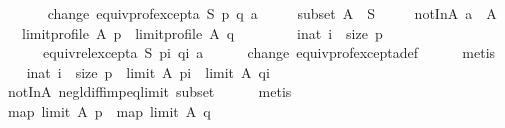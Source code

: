 \begin{isabellebody}
\ \ \isanewline
\ \ \ \ change{\isacharcolon}{\kern0pt}\ {\isachardoublequoteopen}equiv{\isacharunderscore}{\kern0pt}prof{\isacharunderscore}{\kern0pt}except{\isacharunderscore}{\kern0pt}a\ S\ p\ q\ a{\isachardoublequoteclose}\ \isanewline
\ \ \ \ subset{\isacharcolon}{\kern0pt}\ {\isachardoublequoteopen}A\ {\isasymsubseteq}\ S{\isachardoublequoteclose}\ \isanewline
\ \ \ \ notInA{\isacharcolon}{\kern0pt}\ {\isachardoublequoteopen}a\ {\isasymnotin}\ A{\isachardoublequoteclose}\isanewline
\ \ \ {\isachardoublequoteopen}limit{\isacharunderscore}{\kern0pt}profile\ A\ p\ {\isacharequal}{\kern0pt}\ limit{\isacharunderscore}{\kern0pt}profile\ A\ q{\isachardoublequoteclose}\isanewline
%
\isadelimproof
%
\endisadelimproof
%
\isatagproof
{}\isamarkupfalse%
\ {\isacharminus}{\kern0pt}\isanewline
\ \ \isamarkupfalse%
\isanewline
\ \ \ \ {\isachardoublequoteopen}{\isasymforall}i{\isacharcolon}{\kern0pt}{\isacharcolon}{\kern0pt}nat{\isachardot}{\kern0pt}\ i\ {\isacharless}{\kern0pt}\ size\ p\ {\isasymlongrightarrow}\isanewline
\ \ \ \ \ \ equiv{\isacharunderscore}{\kern0pt}rel{\isacharunderscore}{\kern0pt}except{\isacharunderscore}{\kern0pt}a\ S\ {\isacharparenleft}{\kern0pt}p{\isacharbang}{\kern0pt}i{\isacharparenright}{\kern0pt}\ {\isacharparenleft}{\kern0pt}q{\isacharbang}{\kern0pt}i{\isacharparenright}{\kern0pt}\ a{\isachardoublequoteclose}\isanewline
\ \ \ \ \isamarkupfalse%
\ change\ equiv{\isacharunderscore}{\kern0pt}prof{\isacharunderscore}{\kern0pt}except{\isacharunderscore}{\kern0pt}a{\isacharunderscore}{\kern0pt}def\isanewline
\ \ \ \ \isamarkupfalse%
\ metis\isanewline
\ \ \isamarkupfalse%
\ {\isachardoublequoteopen}{\isasymforall}i{\isacharcolon}{\kern0pt}{\isacharcolon}{\kern0pt}nat{\isachardot}{\kern0pt}\ i\ {\isacharless}{\kern0pt}\ size\ p\ {\isasymlongrightarrow}\ limit\ A\ {\isacharparenleft}{\kern0pt}p{\isacharbang}{\kern0pt}i{\isacharparenright}{\kern0pt}\ {\isacharequal}{\kern0pt}\ limit\ A\ {\isacharparenleft}{\kern0pt}q{\isacharbang}{\kern0pt}i{\isacharparenright}{\kern0pt}{\isachardoublequoteclose}\isanewline
\ \ \ \ \isamarkupfalse%
\ notInA\ negl{\isacharunderscore}{\kern0pt}diff{\isacharunderscore}{\kern0pt}imp{\isacharunderscore}{\kern0pt}eq{\isacharunderscore}{\kern0pt}limit\ subset\isanewline
\ \ \ \ \isamarkupfalse%
\ metis\isanewline
\ \ \isamarkupfalse%
\ {\isachardoublequoteopen}map\ {\isacharparenleft}{\kern0pt}limit\ A{\isacharparenright}{\kern0pt}\ p\ {\isacharequal}{\kern0pt}\ map\ {\isacharparenleft}{\kern0pt}limit\ A{\isacharparenright}{\kern0pt}\ q{\isachardoublequoteclose}\isanewline

\end{isabellebody}
